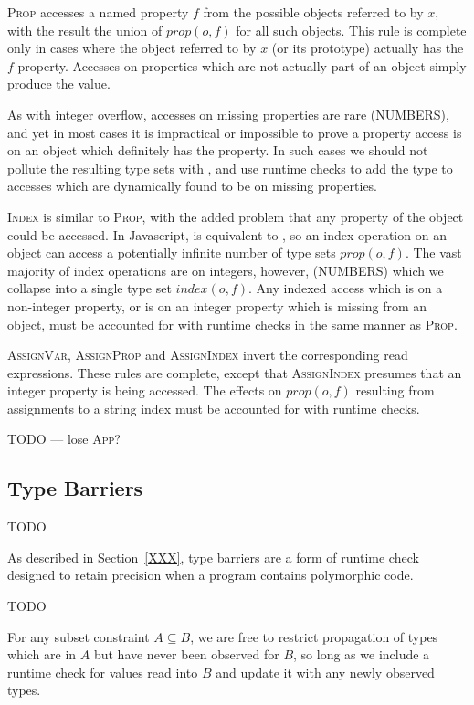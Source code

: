 \textsc{Prop} accesses a named property $f$ from the possible objects
referred to by $x$,
with the result the union of $prop(o,f)$ for all such objects.
This rule is complete only in cases where the object referred to by $x$
(or its prototype) actually has the $f$ property.
Accesses on properties which are not actually part of an object simply
produce the  value.

As with integer overflow, accesses on missing properties are rare
(NUMBERS), and yet in most cases it is impractical or impossible
to prove a property access is on an object which definitely has the
property. In such cases we should not pollute the resulting type
sets with , and use runtime checks to add the 
type to accesses which are dynamically found to be on missing properties.

\textsc{Index} is similar to \textsc{Prop}, with the added problem
that any property of the object could be accessed.
In Javascript,  is equivalent to , so an index
operation on an object can access a potentially
infinite number of type sets $prop(o,f)$.
The vast majority of index operations are on integers, however, (NUMBERS)
which we collapse into a single type set $index(o,f)$.
Any indexed access which is on a non-integer property, or is on an
integer property which is missing from an object,
must be accounted for with runtime checks in the same manner as \textsc{Prop}.

\textsc{AssignVar}, \textsc{AssignProp} and \textsc{AssignIndex} invert
the corresponding read expressions.
These rules are complete, except that \textsc{AssignIndex} presumes that
an integer property is being accessed.
The effects on $prop(o,f)$ resulting from assignments to a string
index  must be accounted for with runtime checks.

TODO --- lose \textsc{App}?

\subsection{Type Barriers}

TODO

As described in Section~\ref{XXX}, type barriers are a form of runtime
check designed to retain precision when a program contains polymorphic code.

TODO

For any subset constraint $A \subseteq B$, we are free to restrict
propagation of types which are in $A$ but have never been observed for $B$,
so long as we include a runtime check for values read into $B$ and update
it with any newly observed types.

